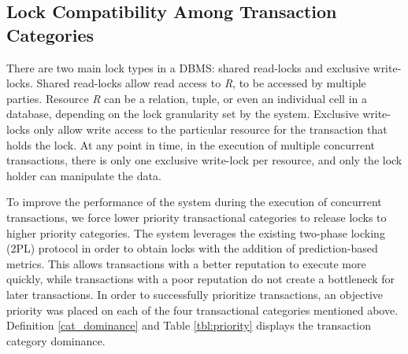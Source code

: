 \subsection{Lock Compatibility Among Transaction Categories}
\label{pbs:lock_compatibility}
There are two main lock types in a DBMS: shared read-locks and exclusive write-locks. Shared read-locks allow read access to \textit{R}, to be accessed by multiple parties. Resource \textit{R} can be a relation, tuple, or even an individual cell in a database, depending on the lock granularity set by the system. Exclusive write-locks only allow write access to the particular resource for the transaction that holds the lock. At any point in time, in the execution of multiple concurrent transactions, there is only one exclusive write-lock per resource, and only the lock holder can manipulate the data.

To improve the performance of the system during the execution of concurrent transactions, we force lower priority transactional categories to release locks to higher priority categories. The system leverages the existing two-phase locking (2PL) protocol in order to obtain locks with the addition of prediction-based metrics. This allows transactions with a better reputation to execute more quickly, while transactions with a poor reputation do not create a bottleneck for later transactions. In order to successfully prioritize transactions, an objective priority was placed on each of the four transactional categories mentioned above. Definition \ref{cat_dominance} and Table \ref{tbl:priority} displays the transaction category dominance.

